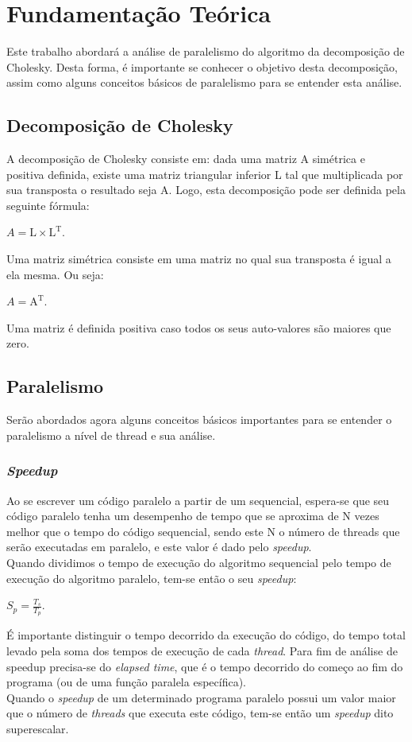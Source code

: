 \documentclass[12pt]{article}
\newcommand\tab[1][1cm]{\hspace*{#1}}
\begin{document}
\section{Fundamentação Teórica} \label{sec:fund}

\tab Este trabalho abordará a análise de paralelismo do algoritmo da decomposição de Cholesky. Desta forma, é importante se conhecer o objetivo desta decomposição, assim como alguns conceitos básicos de paralelismo para se entender esta análise. 

\subsection{Decomposição de Cholesky}\label{subsec:chol}
\tab A decomposição de Cholesky consiste em: dada uma matriz A simétrica e positiva definida, existe uma matriz triangular inferior L tal que multiplicada por sua transposta o resultado seja A. Logo, esta decomposição pode ser definida pela seguinte fórmula: 
\begin{center}
$A = \text{L} \times \text{L}^\text{T}$.
\end{center}
\tab Uma matriz simétrica consiste em uma matriz no qual sua transposta é igual a ela mesma. Ou seja: 
\begin{center}
$A = \text{A}^\text{T}$.
\end{center}
\tab Uma matriz é definida positiva caso todos os seus auto-valores são maiores que zero. 

\subsection{Paralelismo}\label{subsec:paralel}

\tab Serão abordados agora alguns conceitos básicos importantes para se entender o paralelismo a nível de thread e sua análise.

\subsubsection{\textit{Speedup}}\label{subsubsec:speedup}
\tab Ao se escrever um código paralelo a partir de um sequencial, espera-se que seu código paralelo tenha um desempenho de tempo que se aproxima de N vezes melhor que o tempo do código sequencial, sendo este N o número de threads que serão executadas em paralelo, e este valor é dado pelo \textit{speedup}. 
\\
\tab Quando dividimos o tempo de execução do algoritmo sequencial pelo tempo de execução do algoritmo paralelo, tem-se então o seu \textit{speedup}: 
\begin{center}
$S_p = \frac{T_s}{T_p}$. 
\end{center}
\tab É importante distinguir o tempo decorrido da execução do código, do tempo total levado pela soma dos tempos de execução de cada \textit{thread}. Para fim de análise de speedup precisa-se do \textit{elapsed time}, que é o tempo decorrido do começo ao fim do programa (ou de uma função paralela específica). 
\\
\tab Quando o \textit{speedup} de um determinado programa paralelo possui um valor maior que o número de \textit{threads} que executa este código, tem-se então um \textit{speedup} dito superescalar.
\end{document}

